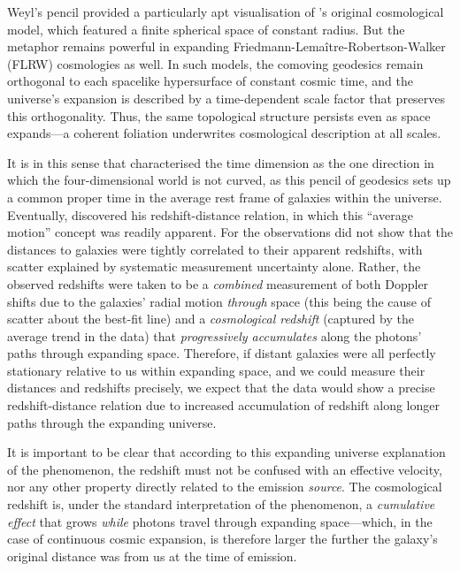 \documentclass[12pt]{book}
\begin{document}
Weyl's pencil provided a particularly apt visualisation of \citet{Einstein1917}'s original cosmological model, which featured a finite spherical space of constant radius. But the metaphor remains powerful in expanding Friedmann-Lemaître-Robertson-Walker (FLRW) cosmologies as well. In such models, the comoving geodesics remain orthogonal to each spacelike hypersurface of constant cosmic time, and the universe's expansion is described by a time-dependent scale factor that preserves this orthogonality. Thus, the same topological structure persists even as space expands---a coherent foliation underwrites cosmological description at all scales.

It is in this sense that \citet{Eddington1920} characterised the time dimension as the one direction in which the four-dimensional world is not curved, as this pencil of geodesics sets up a common proper time in the average rest frame of galaxies within the universe. Eventually, \citet{Hubble1929} discovered his redshift-distance relation, in which this ``average motion'' concept was readily apparent. For the observations did not show that the distances to galaxies were tightly correlated to their apparent redshifts, with scatter explained by systematic measurement uncertainty alone. Rather, the observed redshifts were taken to be a \textit{combined} measurement of both Doppler shifts due to the galaxies' radial motion \textit{through} space (this being the cause of scatter about the best-fit line) and a \textit{cosmological redshift} (captured by the average trend in the data) that \textit{progressively accumulates} along the photons' paths through expanding space. Therefore, if distant galaxies were all perfectly stationary relative to us within expanding space, and we could measure their distances and redshifts precisely, we expect that the data would show a precise redshift-distance relation due to increased accumulation of redshift along longer paths through the expanding universe.

It is important to be clear that according to this expanding universe explanation of the phenomenon, the redshift must not be confused with an effective velocity, nor any other property directly related to the emission \textit{source}. The cosmological redshift is, under the standard interpretation of the phenomenon, a \textit{cumulative effect} that grows \textit{while} photons travel through expanding space---which, in the case of continuous cosmic expansion, is therefore larger the further the galaxy's original distance was from us at the time of emission.
\end{document}
